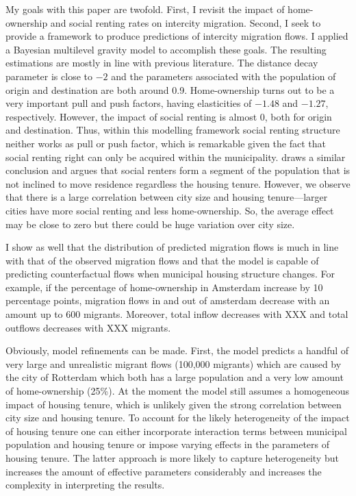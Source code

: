 \documentclass[fleqn,10pt]{SelfArx} %
\begin{document}
{{My goals with this paper are twofold. First, I revisit the impact of home-ownership and social renting rates on
intercity migration. Second, I seek to provide a framework to produce predictions of intercity migration flows. 
I applied a Bayesian multilevel gravity model to accomplish these goals. The resulting estimations are mostly in line with previous literature. 
The distance decay parameter is close to $-2$ and the parameters associated with the population of origin and destination are both around 0.9.
Home-ownership turns out to be a very important pull and push factors, having elasticities of $-1.48$ and $-1.27$, respectively. However, the impact of social renting is almost 
0, both for origin and destination. Thus, within this modelling framework social renting structure neither works as pull or push factor, which is remarkable given the 
fact that social renting right can only be acquired within the municipality. \citet{boyle1998migration} draws a similar conclusion and argues that social renters form a segment of the population that is not inclined to move residence regardless the housing tenure. However, we observe that there is a large correlation between city size and housing tenure---larger cities have more social renting and less home-ownership. So, the average effect may be close to zero but there could be huge variation over city size. 

I show as well that the distribution of predicted migration flows is much in line with that of the observed migration flows and that the model is capable of predicting counterfactual flows when municipal housing structure changes. For example, if the percentage of home-ownership in Amsterdam increase by 10 percentage points, migration flows in and out of amsterdam decrease with an amount up to 600 migrants. Moreover, total inflow decreases with XXX and total outflows decreases with XXX migrants. 

Obviously, model refinements can be made. First, the model predicts a handful of very large and unrealistic migrant flows (100,000 migrants) which are caused by the city of Rotterdam which both has a large population and a very low amount of home-ownership (25\%). At the moment the model still assumes a homogeneous impact of housing tenure, which is unlikely given the strong correlation between city size and housing tenure. To account for the likely heterogeneity of the impact of housing tenure one can either incorporate interaction terms between municipal population and housing tenure or impose varying effects in the parameters of housing tenure. The latter approach is more likely to capture heterogeneity but increases the amount of effective parameters considerably and increases the complexity in interpreting the results. 

}}
\end{document}

